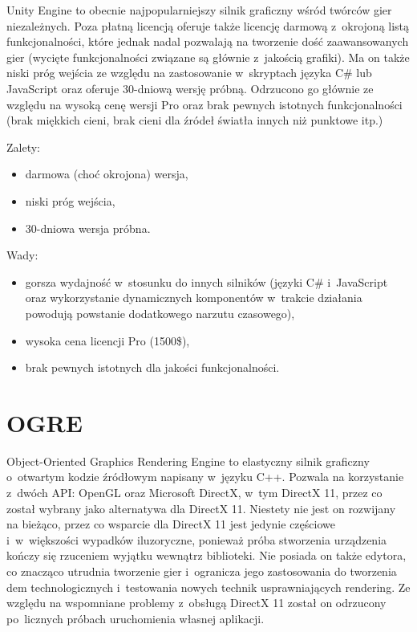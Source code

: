 Unity Engine to obecnie najpopularniejszy silnik graficzny wśród twórców gier niezależnych. Poza płatną licencją oferuje także licencję darmową z~okrojoną listą funkcjonalności, które jednak nadal pozwalają na tworzenie dość zaawansowanych gier (wycięte funkcjonalności związane są głównie z~jakością grafiki). Ma on także niski próg wejścia ze względu na zastosowanie w~skryptach języka C\# lub JavaScript oraz oferuje 30-dniową wersję próbną. Odrzucono go głównie ze względu na wysoką cenę wersji Pro oraz brak pewnych istotnych funkcjonalności (brak miękkich cieni, brak cieni dla źródeł światła innych niż punktowe itp.)\\

{\raggedright Zalety:
\begin{itemize}
\item darmowa (choć okrojona) wersja,
\item niski próg wejścia,
\item 30-dniowa wersja próbna.
\end{itemize}

Wady:
\begin{itemize}
\item gorsza wydajność w~stosunku do innych silników (języki C\# i~JavaScript oraz wykorzystanie dynamicznych komponentów w~trakcie działania powodują powstanie dodatkowego narzutu czasowego),
\item wysoka cena licencji Pro (1500\$),
\item brak pewnych istotnych dla jakości funkcjonalności.
\end{itemize}
}
\section{OGRE}

Object-Oriented Graphics Rendering Engine to elastyczny silnik graficzny o~otwartym kodzie źródłowym napisany w~języku C++. Pozwala na korzystanie z~dwóch API: OpenGL oraz Microsoft DirectX, w~tym DirectX 11, przez co został wybrany jako alternatywa dla DirectX 11. Niestety nie jest on rozwijany na bieżąco, przez co wsparcie dla DirectX 11 jest jedynie częściowe i~w~większości wypadków iluzoryczne, ponieważ próba stworzenia urządzenia kończy się rzuceniem wyjątku wewnątrz biblioteki. Nie posiada on także edytora, co znacząco utrudnia tworzenie gier i~ogranicza jego zastosowania do tworzenia dem technologicznych i~testowania nowych technik usprawniających rendering. Ze względu na wspomniane problemy z~obsługą DirectX 11 został on odrzucony po~licznych próbach uruchomienia własnej aplikacji.\\

